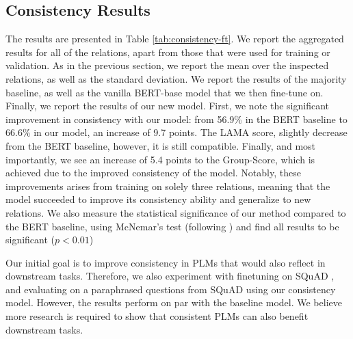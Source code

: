 \subsection{Consistency Results}



The results are presented in Table \ref{tab:consistency-ft}. We report the aggregated results for all of the relations, apart from those that were used for training or validation. As in the previous section, we report the mean over the inspected relations, as well as the standard deviation.
We report the results of the majority baseline, as well as the vanilla BERT-base model that we then fine-tune on. Finally, we report the results of our new model.
First, we note the significant improvement in consistency with our model: from 56.9\% in the BERT baseline to 66.6\% in our model, an increase of 9.7 points.
The LAMA score, slightly decrease from the BERT baseline, however, it is still compatible. Finally, and most importantly, we see an increase of 5.4 points to the Group-Score, which is achieved due to the improved consistency of the model.
Notably, these improvements arises from training on solely three relations, meaning that the model succeeded to improve its consistency ability and generalize to new relations.
We also measure the statistical significance of our method compared to the BERT baseline, using McNemar's test (following \citet{dror2018hitchhiker,dror2020statistical}) and find all results to be significant ($p<0.01$)

Our initial goal is to improve consistency in PLMs that would also reflect in downstream tasks. Therefore, we also experiment with finetuning on SQuAD \cite{squad}, and evaluating on a paraphrased questions from SQuAD \cite{squad-paraphrase} using our consistency model. However, the results perform on par with the baseline model.
We believe more research is required to show that consistent PLMs can also benefit downstream tasks.


